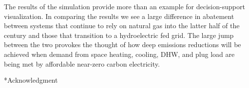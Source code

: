 \documentclass[twocolumn, a4paper,10pt]{article}
\makeatletter
\renewcommand\section{\@startsection{section}{1}{\z@}{3pt}{3pt}{\normalfont\large\bfseries}}
\makeatother
\begin{document}
The results of the simulation provide more than an example for decision-support visualization. In comparing the results we see a large difference in abatement between systems that continue to rely on natural gas into the latter half of the century and those that transition to a hydroelectric fed grid. The large jump between the two provokes the thought of how deep emissions reductions will be achieved when demand from space heating, cooling, DHW, and plug load are being met by affordable near-zero carbon electricity.

\section*{Acknowledgment}


\footnotesize


\end{document}
